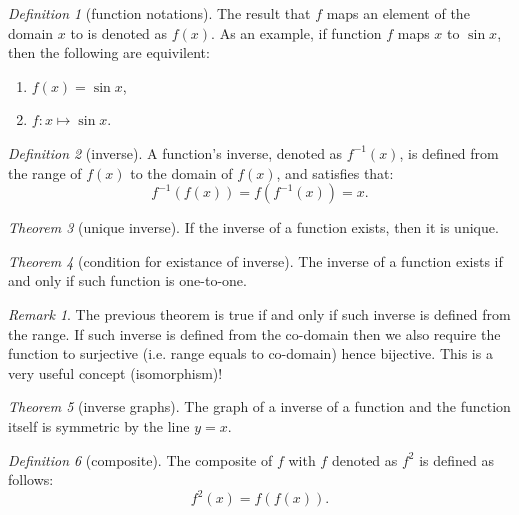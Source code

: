 \documentclass[8pt]{article}
\theoremstyle{remark}
\newtheorem{theorem}{Theorem}[section]
\newtheorem{definition}[theorem]{Definition}
\newtheorem*{remark}{Remark}
\begin{document}
        \begin{definition}[function notations]
            The result that $f$ maps an element of the domain $x$ to is denoted as $f(x)$. As an example, if function $f$ maps $x$ to $\sin x$, then the following are equivilent:
            \begin{enumerate}
                \item $f(x) = \sin x$,
                \item $f: x \mapsto \sin x$.
            \end{enumerate}
        \end{definition}

        \begin{definition}[inverse]
            A function's inverse, denoted as $f^{-1}(x)$, is defined from the range of $f(x)$ to the domain of $f(x)$, and satisfies that:
            $$
                f^{-1}(f(x)) = f(f^{-1}(x))= x.
            $$
        \end{definition}

        \begin{theorem}[unique inverse]
            If the inverse of a function exists, then it is unique.
        \end{theorem}

        \begin{theorem}[condition for existance of inverse]
            The inverse of a function exists if and only if such function is one-to-one.
        \end{theorem}

        \begin{remark}
            The previous theorem is true if and only if such inverse is defined from the range. If such inverse is defined from the co-domain then we also require the function to surjective (i.e. range equals to co-domain) hence bijective. This is a very useful concept (isomorphism)!
        \end{remark}

        \begin{theorem}[inverse graphs]
            The graph of a inverse of a function and the function itself is symmetric by the line $y = x$.
        \end{theorem}

        \begin{definition}[composite]
            The composite of $f$ with $f$ denoted as $f^2$ is defined as follows:
            $$
            f^2(x) = f(f(x)).
            $$
        \end{definition}
\end{document}

